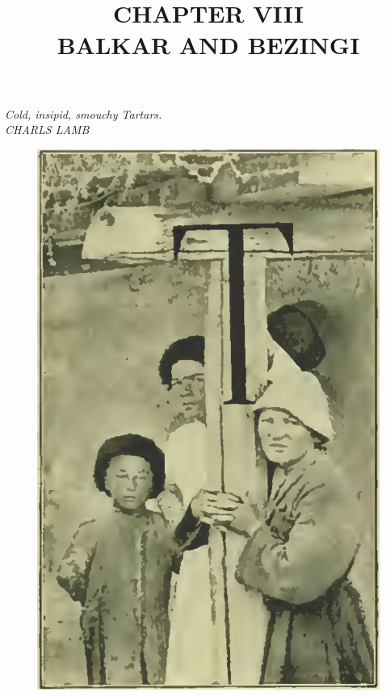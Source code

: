 \documentclass[25pt, a4paper]{article}
\begin{document}
\title{CHAPTER VIII \\ BALKAR AND BEZINGI}
\maketitle	
\begin{center}
		\textit{Cold, insipid, smouchy Tartars.\\ CHARLS LAMB}
\end{center}

\begin{figure}
	\centering
	\vspace{-\normalbaselineskip}
	\includegraphics[width=11\normalbaselineskip]{./Images/Figure_1.jpg}
\end{figure}
\end{document}
